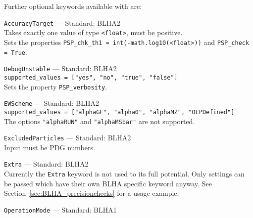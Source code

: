 Further optional keywords available with \gosam are:
\begin{basedescript}{\desclabelstyle{\pushlabel}}
    \item[\hspace{-1em}]\colorbox{gray!30}{\lstinline[style=in]|AccuracyTarget|} --- Standard: BLHA2\vspace{0.1cm}\\
        Takes exactly one value of type \texttt{<float>}, must be positive.\\
        Sets the properties \lstinline[style=in]|PSP_chk_th1 = int(-math.log10(<float>))| and  \lstinline[style=in]|PSP_check = True|.
    \item[\hspace{-1em}]\colorbox{gray!30}{\lstinline[style=in]|DebugUnstable|} --- Standard: BLHA2\vspace{0.1cm}\\
        \lstinline[style=in]|supported_values = ["yes", "no", "true", "false"]|\\
        Sets the property \texttt{PSP\_verbosity}.
    \item[\hspace{-1em}]\colorbox{gray!30}{\lstinline[style=in]|EWScheme|} --- Standard: BLHA2\vspace{0.1cm}\\
        \lstinline[style=in]|supported_values = ["alphaGF", "alpha0", "alphaMZ", "OLPDefined"]|\\
        The options \texttt{"alphaRUN"} and \texttt{"alphaMSbar"} are not supported.
    \item[\hspace{-1em}]\colorbox{gray!30}{\lstinline[style=in]|ExcludedParticles|} --- Standard: BLHA2\vspace{0.1cm}\\
        Input must be PDG numbers.
    \item[\hspace{-1em}]\colorbox{gray!30}{\lstinline[style=in]|Extra|} --- Standard: BLHA2\vspace{0.1cm}\\
        Currently the \texttt{Extra} keyword is not used to its full potential. Only settings can be passed which have their own BLHA specific keyword anyway. See Section~\ref{sec:BLHA_precisionchecks} for a usage example.
    \item[\hspace{-1em}]\colorbox{gray!30}{\lstinline[style=in]|OperationMode|} --- Standard: BLHA1\vspace{0.1cm}\\

\end{basedescript}
